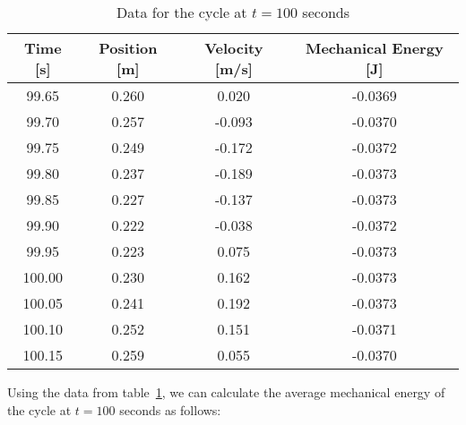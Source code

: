 \documentclass{article}
\begin{document}
            \begin{table}[H]
                \centering
                \begin{tabular}{|c|c|c|c|}
                    \hline
                    Time [s] & Position [m] & Velocity [m/s] & Mechanical Energy [J] \\
                    \hline
                    99.65    & 0.260        & 0.020          & -0.0369               \\
                    \hline
                    99.70    & 0.257        & -0.093         & -0.0370               \\
                    \hline
                    99.75    & 0.249        & -0.172         & -0.0372               \\
                    \hline
                    99.80    & 0.237        & -0.189         & -0.0373               \\
                    \hline
                    99.85    & 0.227        & -0.137         & -0.0373               \\
                    \hline
                    99.90    & 0.222        & -0.038         & -0.0372               \\
                    \hline
                    99.95    & 0.223        & 0.075          & -0.0373               \\
                    \hline
                    100.00   & 0.230        & 0.162          & -0.0373               \\
                    \hline
                    100.05   & 0.241        & 0.192          & -0.0373               \\
                    \hline
                    100.10   & 0.252        & 0.151          & -0.0371               \\
                    \hline
                    100.15   & 0.259        & 0.055          & -0.0370               \\
                    \hline
                \end{tabular} %
                \caption{Data for the cycle at $t=100$ seconds}\label{tab:cycle-at-100-seconds-mechanical-energy-table}
            \end{table}
            
            Using the data from table~\ref{tab:cycle-at-100-seconds-mechanical-energy-table}, we can calculate the average mechanical energy of the cycle at $t=100$ seconds as follows:
            
\end{document}
